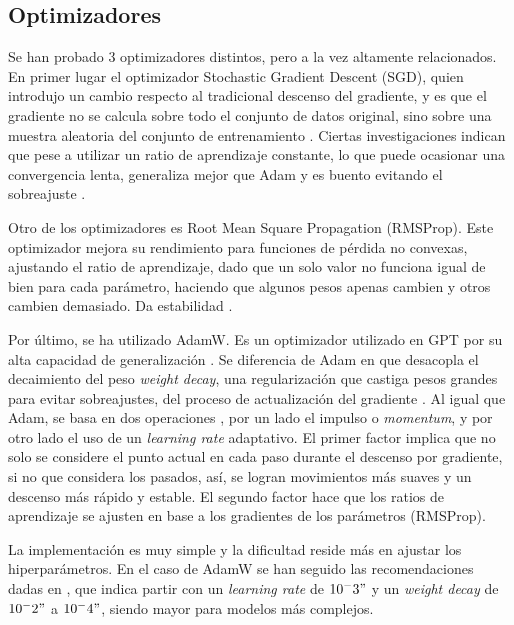 \documentclass[11pt]{book}
\begin{document}
\subsection{Optimizadores}

Se han probado 3 optimizadores distintos, pero a la vez altamente relacionados. En primer lugar el optimizador Stochastic Gradient Descent (SGD), quien introdujo un cambio respecto al tradicional descenso del gradiente, y es que el gradiente no se calcula sobre todo el conjunto de datos original, sino sobre una muestra aleatoria del conjunto de entrenamiento \parencite{geeksforgeeks_sgd}. Ciertas investigaciones indican que pese a utilizar un ratio de aprendizaje constante, lo que puede ocasionar una convergencia lenta, generaliza mejor que Adam y es buento evitando el sobreajuste \parencite{ultralytics_adam_glossary}. 

Otro de los optimizadores es Root Mean Square Propagation (RMSProp). Este optimizador mejora su rendimiento para funciones de pérdida no convexas, ajustando el ratio de aprendizaje, dado que un solo valor no funciona igual de bien para cada parámetro, haciendo que algunos pesos apenas cambien y otros cambien demasiado. Da estabilidad \parencite{kashyap2024rmsprop}.

Por último, se ha utilizado AdamW. Es un optimizador utilizado en GPT por su alta capacidad de generalización . Se diferencia de Adam en que desacopla el decaimiento del peso \textit{weight decay}, una regularización que castiga pesos grandes para evitar sobreajustes, del proceso de actualización del gradiente \parencite{datacamp_adamw_pytorch}.  Al igual que Adam, se basa en dos operaciones \parencite{yassin2024adamvsadamw}, por un lado el impulso o \textit{momentum}, y por otro lado el uso de un \textit{learning rate} adaptativo. El primer factor implica que no solo se considere el punto actual en cada paso durante el descenso por gradiente, si no que considera los pasados, así, se logran movimientos más suaves y un descenso más rápido y estable. El segundo factor hace que los ratios de aprendizaje se ajusten en base a los gradientes de los parámetros (RMSProp).

La implementación es muy simple y la dificultad reside más en ajustar los hiperparámetros. En el caso de AdamW se han seguido las recomendaciones dadas en \parencite{datacamp_adamw_pytorch}, que indica partir con un \textit{learning rate} de $10^-3"$ y un \textit{weight decay} de $10^-2"$ a $10^-4"$, siendo mayor para modelos más complejos. 
\end{document}
